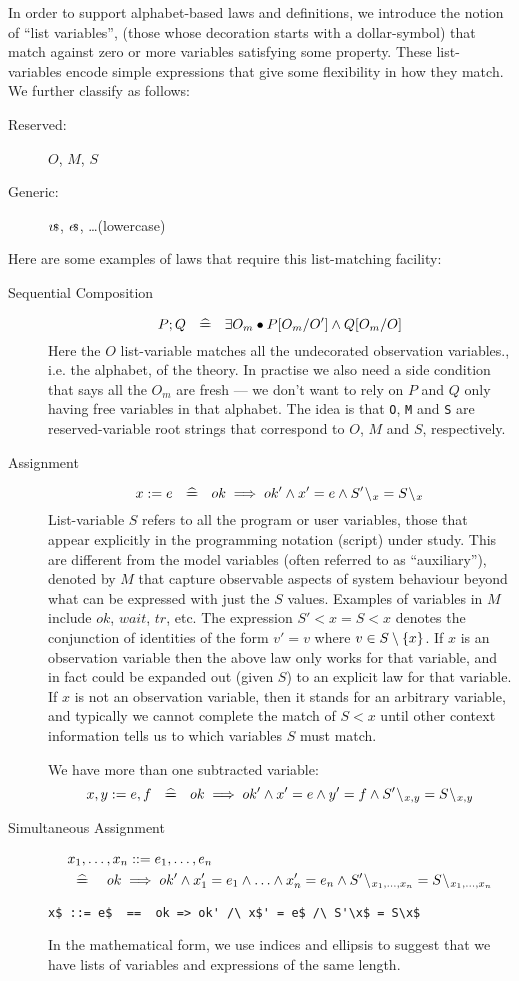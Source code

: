 In order to support alphabet-based laws and definitions,
we introduce the notion of ``list variables'',
(those whose decoration starts with a dollar-symbol)
that match against zero or more variables satisfying some property.
These list-variables encode simple expressions that give
some flexibility in how they match.
We further classify as follows:
\begin{description}
  \item[Reserved:]  $O$, $M$, $S$
  \item[Generic:] $v\!{\scriptstyle{\mathsf{\$}}}$, $e\!{\scriptstyle{\mathsf{\$}}}$, \ldots (lowercase)
\end{description}
Here are some examples of laws that require this list-matching facility:
\begin{description}
%
\item[Sequential Composition]
$$
  P ; Q ~\mathrel{~\widehat{=\!\!\!\!=}}~~ \exists O_m \bullet P[O_m/O'] \land Q[O_m/O]
$$
Here the $O$ list-variable matches all the undecorated
observation variables., i.e. the alphabet, of the theory.
In practise we also need a side condition that says all the $O_m$
are fresh --- we don't want to rely on $P$ and $Q$ only having free variables
in that alphabet.
The idea is that \texttt{O}, \texttt{M} and \texttt{S} are reserved-variable root strings that
correspond to $O$, $M$ and $S$, respectively.
%
\item[Assignment]
$$
  x := e ~\defs~ ok \implies ok' \land x' = e
    \land S'\less x = S\less x
$$
List-variable $S$ refers to all the program or user variables,
those that appear explicitly in the programming notation (script) under study.
This are different from the model variables (often referred to as
``auxiliary''), denoted by $M$ that capture observable aspects
of system behaviour beyond what can be expressed with just the $S$
values. Examples of variables in $M$ include $ok$, $wait$, $tr$, etc.
The expression $S'\less x = S\less x$
denotes the conjunction of identities of the form $v'=v$
where $v \in S\setminus\{{x}\}$.
If $x$ is an observation variable
then the above law only works for that variable,
and in fact could be expanded out (given $S$)
to an explicit law for that variable.
If $x$ is not an observation variable,
then it stands for an arbitrary variable,
and typically we cannot complete the match of $S\less x$
until
other context information tells us to which variables $S$ must match.
\par
We have more than one subtracted variable:
$$
  x,y := e,f ~\defs~ ok \implies ok' \land x' = e \land y'=f
    \land S'\less{x,y} = S\less{x,y}
$$
\item[Simultaneous Assignment]
\begin{eqnarray*}
  \lefteqn{x_1,\ldots,x_n ::= e_1, \ldots , e_n}
\\ &\defs&
     ok \implies ok'
     \land x'_1 = e_1 \land \ldots \land x'_n = e_n
     \land S'\less{x_1,\ldots,x_n} = S\less{x_1,\ldots,x_n}
\end{eqnarray*}
\begin{verbatim}
x$ ::= e$  ==  ok => ok' /\ x$' = e$ /\ S'\x$ = S\x$
\end{verbatim}
In the mathematical form, we use indices and ellipsis
to suggest that we have lists of variables and expressions
of the same length.
\end{description}

